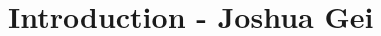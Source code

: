 \documentclass[11pt]{article}		%
\begin{document}
	\newpage
	
	\pagestyle{empty}
	
	\setlength{\headheight}{18pt}
	
	\setlength{\columnsep}{1.5cm} %
	\setlength{\columnseprule}{0.5pt} %
	
	\begin{multicols*}{2}
		\RaggedRight
	    \tableofcontents
    \end{multicols*}
	
	\setlength{\columnsep}{10pt} %
	\setlength{\columnseprule}{0pt} %
	
	\newpage
    \pagestyle{fancy}
	\setcounter{page}{1}
	

	\section[Introduction]{Introduction - Joshua Gei}
	
\end{document}
